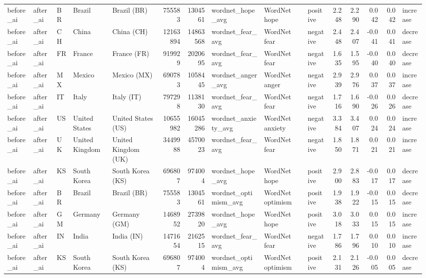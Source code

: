 \begin{tabular}{lllllrrlllrrrrl}
before\_ai & after\_ai & BR & Brazil & Brazil (BR) & 755583 & 1304561 & wordnet\_hope\_avg & WordNet hope & positive & 2.248 & 2.290 & 0.042 & 0.042 & increase \\
before\_ai & after\_ai & CH & China & China (CH) & 12163894 & 14863568 & wordnet\_fear\_avg & WordNet fear & negative & 2.448 & 2.407 & -0.041 & 0.041 & decrease \\
before\_ai & after\_ai & FR & France & France (FR) & 919929 & 2020695 & wordnet\_fear\_avg & WordNet fear & negative & 1.635 & 1.595 & -0.040 & 0.040 & decrease \\
before\_ai & after\_ai & MX & Mexico & Mexico (MX) & 690783 & 1058445 & wordnet\_anger\_avg & WordNet anger & negative & 2.939 & 2.976 & 0.037 & 0.037 & increase \\
before\_ai & after\_ai & IT & Italy & Italy (IT) & 797298 & 1138130 & wordnet\_fear\_avg & WordNet fear & negative & 1.716 & 1.690 & -0.026 & 0.026 & decrease \\
before\_ai & after\_ai & US & United States & United States (US) & 10655982 & 16045286 & wordnet\_anxiety\_avg & WordNet anxiety & negative & 3.384 & 3.407 & 0.024 & 0.024 & increase \\
before\_ai & after\_ai & UK & United Kingdom & United Kingdom (UK) & 3449988 & 4570023 & wordnet\_fear\_avg & WordNet fear & negative & 1.850 & 1.871 & 0.021 & 0.021 & increase \\
before\_ai & after\_ai & KS & South Korea & South Korea (KS) & 696807 & 974004 & wordnet\_hope\_avg & WordNet hope & positive & 2.900 & 2.883 & -0.017 & 0.017 & decrease \\
before\_ai & after\_ai & BR & Brazil & Brazil (BR) & 755583 & 1304561 & wordnet\_optimism\_avg & WordNet optimism & positive & 1.938 & 1.922 & -0.015 & 0.015 & decrease \\
before\_ai & after\_ai & GM & Germany & Germany (GM) & 1468952 & 2739820 & wordnet\_hope\_avg & WordNet hope & positive & 3.018 & 3.033 & 0.015 & 0.015 & increase \\
before\_ai & after\_ai & IN & India & India (IN) & 1471654 & 2162515 & wordnet\_fear\_avg & WordNet fear & negative & 1.786 & 1.796 & 0.010 & 0.010 & increase \\
before\_ai & after\_ai & KS & South Korea & South Korea (KS) & 696807 & 974004 & wordnet\_optimism\_avg & WordNet optimism & positive & 2.131 & 2.126 & -0.005 & 0.005 & decrease \\
\bottomrule
\end{tabular}
